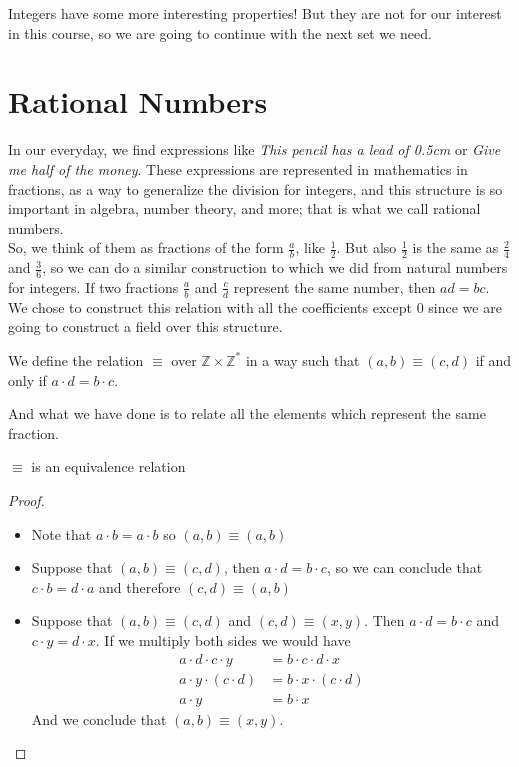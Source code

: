 \documentclass{tufte-handout}
\begin{document}
Integers have some more interesting properties! But they are not for our interest in this course, so we are going to continue with the next set we need.

\section{Rational Numbers}
In our everyday, we find expressions like \textit{This pencil has a lead of 0.5cm} or \textit{Give me half of the money}. These expressions are represented in mathematics in fractions, as a way to generalize the division for integers, and this structure is so important in algebra, number theory, and more; that is what we call rational numbers.\\

So, we think of them as fractions of the form $\frac{a}{b}$, like $\frac{1}{2}$. But also $\frac{1}{2}$ is the same as $\frac{2}{4}$ and $\frac{3}{6}$, so we can do a similar construction to which we did from natural numbers for integers. If two fractions $\frac{a}{b}$ and $\frac{c}{d}$ represent the same number, then $ad = bc$. We chose to construct this relation with all the coefficients except $0$ since we are going to construct a field over this structure.

\begin{definition}
	We define the relation $\equiv$ over $\mathbb{Z} \times \mathbb{Z}^*$ in a way such that $(a, b) \equiv (c, d)$ if and only if $a \cdot d = b \cdot c$.
\end{definition}

And what we have done is to relate all the elements which represent the same fraction.

\begin{theorem}
	$\equiv$ is an equivalence relation
\end{theorem}
\begin{proof}
	\begin{itemize}
		\item Note that $a \cdot b = a \cdot b$ so $(a, b) \equiv (a, b)$
		\item Suppose that $(a, b) \equiv (c, d)$, then $a \cdot d = b \cdot c$, so we can conclude that $c \cdot b = d \cdot a$ and therefore $(c, d) \equiv (a, b)$
		\item Suppose that $(a, b) \equiv (c, d)$ and $(c, d) \equiv (x, y)$. Then $a \cdot d = b \cdot c$ and $c \cdot y = d \cdot x$. If we multiply both sides we would have
		\begin{align*}
			a \cdot d \cdot c \cdot y &= b \cdot c \cdot d \cdot x\\
			a \cdot y \cdot (c \cdot d) &= b \cdot x \cdot (c \cdot d)\\
			a \cdot y &= b \cdot x
		\end{align*}
		And we conclude that $(a, b) \equiv (x, y)$.
	\end{itemize}
\end{proof}
\end{document}
